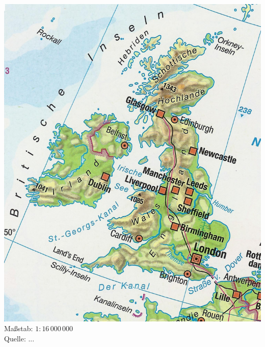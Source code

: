 \documentclass[a4paper,ngerman]{scrartcl}
\begin{document}
\begin{center}%
  \includegraphics[scale=5]{england-grob-grob} \\
  Maßstab: $1 : 16\,000\,000$ \\
  Quelle: ...
\end{center}
\newpage
\end{document}
